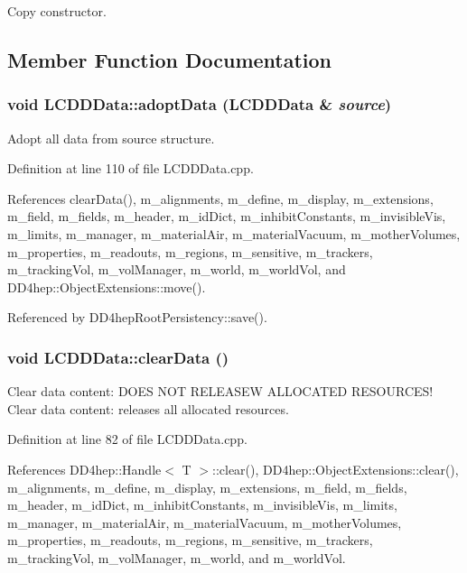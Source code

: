 Copy constructor. 

\subsection{Member Function Documentation}
\hypertarget{class_d_d4hep_1_1_geometry_1_1_l_c_d_d_data_a2f2797cec01fb1e6e6c6e762c9ffc170}{
\subsubsection[{adoptData}]{\setlength{\rightskip}{0pt plus 5cm}void LCDDData::adoptData ({\bf LCDDData} \& {\em source})}}
\label{class_d_d4hep_1_1_geometry_1_1_l_c_d_d_data_a2f2797cec01fb1e6e6c6e762c9ffc170}


Adopt all data from source structure. 

Definition at line 110 of file LCDDData.cpp.

References clearData(), m\_\-alignments, m\_\-define, m\_\-display, m\_\-extensions, m\_\-field, m\_\-fields, m\_\-header, m\_\-idDict, m\_\-inhibitConstants, m\_\-invisibleVis, m\_\-limits, m\_\-manager, m\_\-materialAir, m\_\-materialVacuum, m\_\-motherVolumes, m\_\-properties, m\_\-readouts, m\_\-regions, m\_\-sensitive, m\_\-trackers, m\_\-trackingVol, m\_\-volManager, m\_\-world, m\_\-worldVol, and DD4hep::ObjectExtensions::move().

Referenced by DD4hepRootPersistency::save().\hypertarget{class_d_d4hep_1_1_geometry_1_1_l_c_d_d_data_a6c9bd1b309c7cb21dea26dc6c1504716}{
\subsubsection[{clearData}]{\setlength{\rightskip}{0pt plus 5cm}void LCDDData::clearData ()}}
\label{class_d_d4hep_1_1_geometry_1_1_l_c_d_d_data_a6c9bd1b309c7cb21dea26dc6c1504716}


Clear data content: DOES NOT RELEASEW ALLOCATED RESOURCES! Clear data content: releases all allocated resources. 

Definition at line 82 of file LCDDData.cpp.

References DD4hep::Handle$<$ T $>$::clear(), DD4hep::ObjectExtensions::clear(), m\_\-alignments, m\_\-define, m\_\-display, m\_\-extensions, m\_\-field, m\_\-fields, m\_\-header, m\_\-idDict, m\_\-inhibitConstants, m\_\-invisibleVis, m\_\-limits, m\_\-manager, m\_\-materialAir, m\_\-materialVacuum, m\_\-motherVolumes, m\_\-properties, m\_\-readouts, m\_\-regions, m\_\-sensitive, m\_\-trackers, m\_\-trackingVol, m\_\-volManager, m\_\-world, and m\_\-worldVol.

